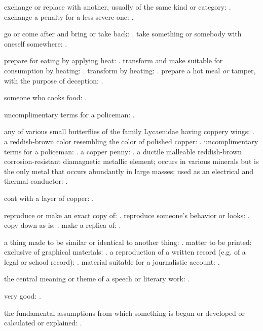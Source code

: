   exchange or replace with another, usually of the same kind or category: . exchange a penalty for a less severe one: .

  go or come after and bring or take back: . take something or somebody with oneself somewhere: .

  prepare for eating by applying heat: . transform and make suitable for consumption by heating: . transform by heating: . prepare a hot meal \textit{or} tamper, with the purpose of deception: .

  someone who cooks food: .

  uncomplimentary terms for a policeman: .

  any of various small butterflies of the family Lycaenidae having coppery wings: . a reddish-brown color resembling the color of polished copper: . uncomplimentary terms for a policeman: . a copper penny: . a ductile malleable reddish-brown corrosion-resistant diamagnetic metallic element; occurs in various minerals but is the only metal that occurs abundantly in large masses; used as an electrical and thermal conductor: .

  coat with a layer of copper: .

  reproduce or make an exact copy of: . reproduce someone's behavior or looks: . copy down as is: . make a replica of: .

  a thing made to be similar or identical to another thing: . matter to be printed; exclusive of graphical materials: . a reproduction of a written record (e.g. of a legal or school record): . material suitable for a journalistic account: .

  the central meaning or theme of a speech or literary work: .

  very good: .

  the fundamental assumptions from which something is begun or developed or calculated or explained: .


